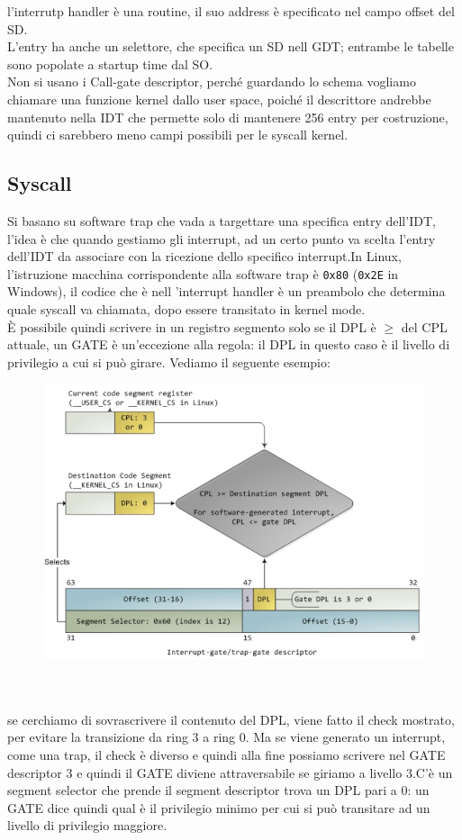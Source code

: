 \documentclass[12pt, oneside]{extbook} %
\begin{document}
l'interrutp handler è una routine, il suo address è specificato nel campo offset del SD.\\L'entry ha anche un selettore, che specifica un SD nell GDT; entrambe le tabelle sono popolate a startup time dal SO.\\Non si usano i Call-gate descriptor, perché guardando lo schema vogliamo chiamare una funzione kernel dallo user space, poiché il descrittore andrebbe mantenuto nella IDT che permette solo di mantenere 256 entry per costruzione, quindi ci sarebbero meno campi possibili per le syscall kernel.

\subsection{Syscall}
Si basano su software trap che vada a targettare una specifica entry dell'IDT, l'idea è che quando gestiamo gli interrupt, ad un certo punto va scelta l'entry dell'IDT da associare con la ricezione dello specifico interrupt.In Linux, l'istruzione macchina corrispondente alla software trap è \texttt{0x80} (\texttt{0x2E} in Windows), il codice che è nell 'interrupt handler è un preambolo che determina quale syscall va chiamata, dopo essere transitato in kernel mode.\\È possibile quindi scrivere in un registro segmento solo se il DPL è $\geq$ del CPL attuale, un GATE è un'eccezione alla regola: il DPL in questo caso è il livello di privilegio a cui si può girare. Vediamo il seguente esempio:\\
\begin{figure}[!h]
	\includegraphics[scale=0.3]{immagini/cpl_change.png}
\end{figure}\\\\
se cerchiamo di sovrascrivere il contenuto del DPL, viene fatto il check mostrato, per evitare la transizione da ring 3 a ring 0. Ma se viene generato un interrupt, come una trap, il check è diverso e quindi alla fine possiamo scrivere nel GATE descriptor 3 e quindi il GATE diviene attraversabile se giriamo a livello 3.C'è un segment selector che prende il segment descriptor trova un DPL pari a 0: un GATE dice quindi qual è il privilegio minimo per cui si può transitare ad un livello di privilegio maggiore.
\end{document}
